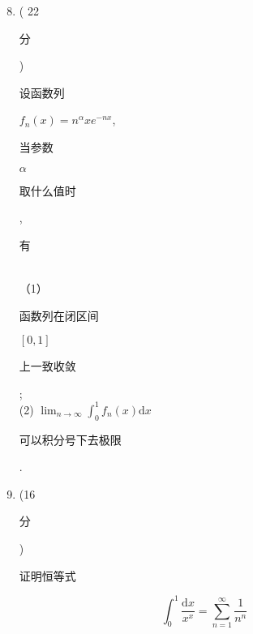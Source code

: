 \documentclass[10pt]{article}
\begin{document}
\begin{enumerate}
  \setcounter{enumi}{7}
  \item ( 22 \begin{CJK}{UTF8}{mj}分\end{CJK}) \begin{CJK}{UTF8}{mj}设函数列\end{CJK} $f_{n}(x)=n^{\alpha} x e^{-n x}$, \begin{CJK}{UTF8}{mj}当参数\end{CJK} $\alpha$ \begin{CJK}{UTF8}{mj}取什么值时\end{CJK}, \begin{CJK}{UTF8}{mj}有\end{CJK}\\
（1）\begin{CJK}{UTF8}{mj}函数列在闭区间\end{CJK} $[0,1]$ \begin{CJK}{UTF8}{mj}上一致收敛\end{CJK};\\
(2) $\lim _{n \rightarrow \infty} \int_{0}^{1} f_{n}(x) \mathrm{d} x$ \begin{CJK}{UTF8}{mj}可以积分号下去极限\end{CJK}.

  \item (16 \begin{CJK}{UTF8}{mj}分\end{CJK}) \begin{CJK}{UTF8}{mj}证明恒等式\end{CJK}

\end{enumerate}
$$
\int_{0}^{1} \frac{\mathrm{d} x}{x^{x}}=\sum_{n=1}^{\infty} \frac{1}{n^{n}}
$$
\end{document}
